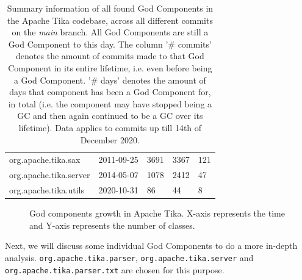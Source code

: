 \documentclass{article}
\begin{document}
\begin{table}[ht]
\begin{tabular}{lllll}
org.apache.tika.sax                      & 2011-09-25   & 3691          & 3367       & 121        \\
org.apache.tika.server                   & 2014-05-07   & 1078          & 2412       & 47         \\
org.apache.tika.utils                    & 2020-10-31   & 86            & 44         & 8         
\end{tabular}
\caption{Summary information of all found God Components in the Apache Tika codebase, across all different commits on the \textit{main} branch. All God Components are still a God Component to this day. The column '\# commits' denotes the amount of commits made to that God Component in its entire lifetime, i.e. even before being a God Component. '\# days' denotes the amount of days that component has been a God Component for, in total (i.e. the component may have stopped being a GC and then again continued to be a GC over its lifetime). Data applies to commits up till 14th of December 2020.}
\label{tab:gc-summary}
\end{table}


\begin{figure}[ht]
    \centering
    
    \label{fig:class_growth}
    \caption{God components growth in Apache Tika. X-axis represents the time and Y-axis represents the number of classes.}
\end{figure}

Next, we will discuss some individual God Components to do a more in-depth analysis. \texttt{org.apache.tika.parser}, \texttt{org.apache.tika.server} and \texttt{org.apache.tika.parser.txt} are chosen for this purpose.
\end{document}
